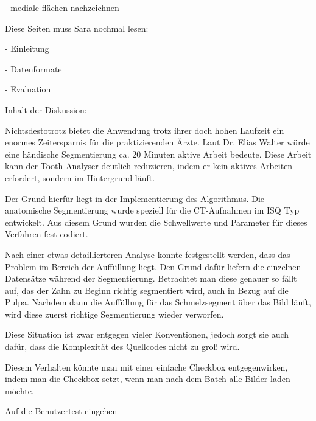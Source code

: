 - mediale flächen nachzeichnen


Diese Seiten muss Sara nochmal lesen:

- Einleitung

- Datenformate

- Evaluation


Inhalt der Diskussion:

Nichtsdestotrotz bietet die Anwendung trotz ihrer doch hohen Laufzeit ein enormes
Zeitersparnis für die praktizierenden Ärzte. Laut Dr. Elias Walter würde eine händische
Segmentierung ca. 20 Minuten aktive Arbeit bedeute. Diese Arbeit kann der Tooth Analyser
deutlich reduzieren, indem er kein aktives Arbeiten erfordert, sondern im Hintergrund
läuft.

Der Grund hierfür liegt in der Implementierung des Algorithmus. Die anatomische
Segmentierung wurde speziell für die \ac{CT}-Aufnahmen im \ac{ISQ} Typ
entwickelt. Aus diesem Grund wurden die Schwellwerte und Parameter für dieses Verfahren
fest codiert.

Nach einer etwas detaillierteren Analyse konnte festgestellt werden, dass das
Problem im Bereich der Auffüllung liegt. Den Grund dafür liefern die einzelnen Datensätze
während der Segmentierung. Betrachtet man diese genauer so fällt auf, das der Zahn
zu Beginn richtig segmentiert wird, auch in Bezug auf die Pulpa. Nachdem dann die
Auffüllung für das Schmelzsegment über das Bild läuft, wird diese zuerst
richtige Segmentierung wieder verworfen.

Diese Situation ist zwar entgegen vieler Konventionen, jedoch sorgt sie auch dafür,
dass die Komplexität des Quellcodes nicht zu groß wird.

Diesem Verhalten könnte man mit einer einfache Checkbox entgegenwirken, indem man
die Checkbox setzt, wenn man nach dem Batch alle Bilder laden möchte.

Auf die Benutzertest eingehen